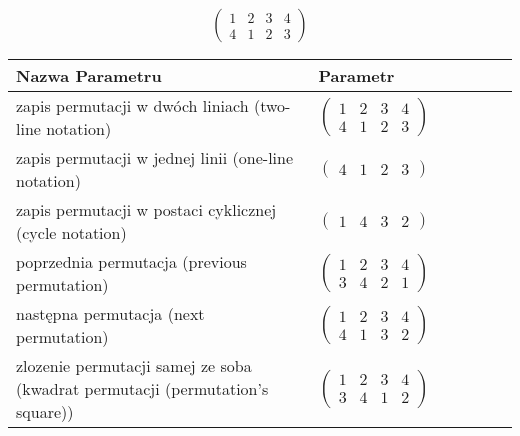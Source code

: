 \documentclass[12pt]{article}
\begin{document}
\subsection{}
\begin{center}
\[
\begin{pmatrix}
	1 & 2 & 3 & 4 \\ 
	4 & 1 & 2 & 3 
\end{pmatrix}
\]

\begin{tabular}{|m{0.6\linewidth}|m{0.4\linewidth}|}
	\hline
	Nazwa Parametru & Parametr \\
	\hline
	zapis permutacji w dwóch liniach (two-line notation) & $\begin{pmatrix} 1 & 2 & 3 & 4 \\ 
4 & 1 & 2 & 3 \end{pmatrix}$ \\ 
	\hline
	zapis permutacji w jednej linii (one-line notation) & $\begin{pmatrix} 4 & 1 & 2 & 3 \end{pmatrix}$ \\ 
	\hline
	zapis permutacji w postaci cyklicznej (cycle notation) & $\begin{pmatrix} 1 & 4 & 3 & 2 \end{pmatrix} $ \\ 
	\hline
	poprzednia permutacja (previous permutation) & $\begin{pmatrix} 1 & 2 & 3 & 4 \\ 
3 & 4 & 2 & 1 \end{pmatrix}$ \\ 
	\hline
	następna permutacja (next permutation) & $\begin{pmatrix} 1 & 2 & 3 & 4 \\ 
4 & 1 & 3 & 2 \end{pmatrix}$ \\ 
	\hline
	zlozenie permutacji samej ze soba (kwadrat permutacji (permutation's square)) & $\begin{pmatrix} 1 & 2 & 3 & 4 \\ 
3 & 4 & 1 & 2 \end{pmatrix}$ \\ 
	\hline
\end{tabular}
\end{center}
\end{document}
